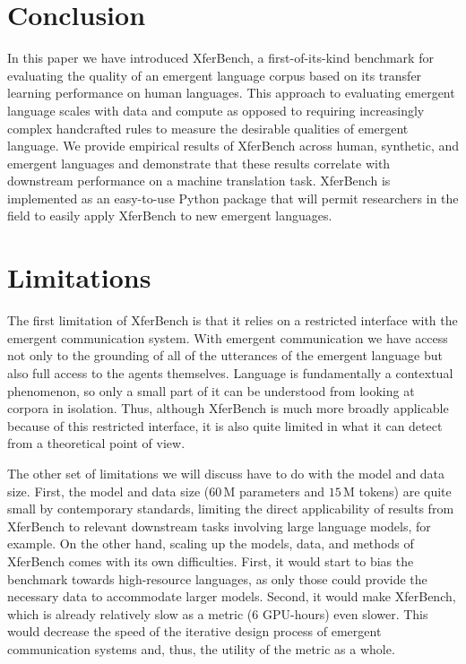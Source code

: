 \section{Conclusion}
In this paper we have introduced XferBench, a first-of-its-kind benchmark for evaluating the quality of an emergent language corpus based on its transfer learning performance on human languages.
This approach to evaluating emergent language scales with data and compute as opposed to requiring increasingly complex handcrafted rules to measure the desirable qualities of emergent language.
We provide empirical results of XferBench across human, synthetic, and emergent languages and demonstrate that these results correlate with downstream performance on a machine translation task.
XferBench is implemented as an easy-to-use Python package that will permit researchers in the field to easily apply XferBench to new emergent languages.



\section{Limitations}
The first limitation of XferBench is that it relies on a restricted interface with the emergent communication system.
With emergent communication we have access not only to the grounding of all of the utterances of the emergent language but also full access to the agents themselves.
Language is fundamentally a contextual phenomenon, so only a small part of it can be understood from looking at corpora in isolation.
Thus, although XferBench is much more broadly applicable because of this restricted interface, it is also quite limited in what it can detect from a theoretical point of view.

The other set of limitations we will discuss have to do with the model and data size.
First, the model and data size ($60\,\text{M}$ parameters and $15\,\text{M}$ tokens) are quite small by contemporary standards, limiting the direct applicability of results from XferBench to relevant downstream tasks involving large language models, for example.
On the other hand, scaling up the models, data, and methods of XferBench comes with its own difficulties.
First, it would start to bias the benchmark towards high-resource languages, as only those could provide the necessary data to accommodate larger models.
Second, it would make XferBench, which is already relatively slow as a metric ($6$ GPU-hours) even slower.
This would decrease the speed of the iterative design process of emergent communication systems and, thus, the utility of the metric as a whole.

